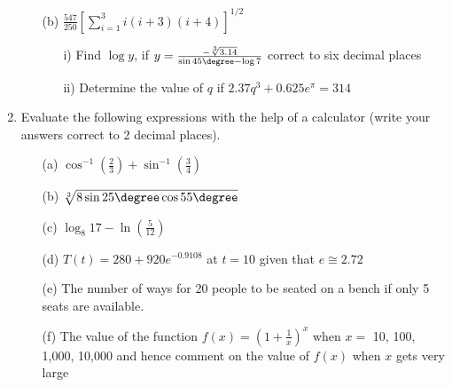 \begin{enumerate}
\begin{enumerate}[topsep=0ex,itemsep=0ex,partopsep=1ex,parsep=1ex]
		\item[(b)] $\frac{547}{250}[\sum_{i=1}^3 i(i+3)(i+4)]^{1/2}$
		\begin{enumerate}[topsep=0ex,itemsep=0ex,partopsep=1ex,parsep=1ex]
			\item[i)] Find $\log{y}$, if $y = \frac{-\sqrt[3]{3.14}}{\sin{45 \degree} - \log{7}}$ correct to six decimal places
			\item[ii)] Determine the value of $q$ if $2.37q^3 + 0.625e^{\pi} = 314$ 
		\end{enumerate}
	\end{enumerate}
	
	\item Evaluate the following expressions with the help of a calculator (write your answers correct to 2 decimal places).
	\begin{enumerate}[topsep=0ex,itemsep=0ex,partopsep=1ex,parsep=1ex]
		\item[(a)] $\cos^{-1}\left(\frac{2}{3}\right) + \sin^{-1}\left(\frac{3}{4}\right)$
		\item[(b)] $\sqrt[3]{8\sin{25 \degree} \cos{55 \degree} }$
		\item[(c)] $\log_8{17} - \ln\left(\frac{5}{12}\right)$
		\item[(d)] $T(t) = 280 + 920e^{-0.9108}$ at $t= 10$ given that $e \cong 2.72$ 
		\item[(e)] The number of ways for 20 people to be seated on a bench if only 5 seats are available.
		\item[(f)] The value of the function $f(x) = \left(1 + \frac{1}{x}\right)^x$ when $x =$ 10, 100, 1,000, 10,000 and hence comment on the value of $f(x)$ when $x$ gets very large
	\end{enumerate}

\end{enumerate}











